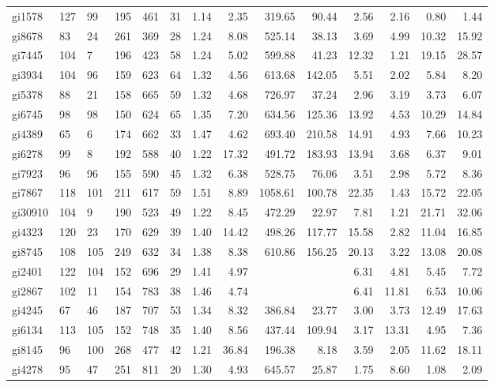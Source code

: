 \documentclass[runningheads]{llncs}
\begin{document}
{\begin{longtable}{l lllll rrrr rrrr }
gi1578 & 127 & 99 & 195 & 461 & 31 & 1.14 & 2.35 & 319.65 & 90.44 & 2.56 & 2.16 & 0.80 & 1.44 \\
gi8678 & 83 & 24 & 261 & 369 & 28 & 1.24 & 8.08 & 525.14 & 38.13 & 3.69 & 4.99 & 10.32 & 15.92 \\
gi7445 & 104 & 7 & 196 & 423 & 58 & 1.24 & 5.02 & 599.88 & 41.23 & 12.32 & 1.21 & 19.15 & 28.57 \\
gi3934 & 104 & 96 & 159 & 623 & 64 & 1.32 & 4.56 & 613.68 & 142.05 & 5.51 & 2.02 & 5.84 & 8.20 \\
gi5378 & 88 & 21 & 158 & 665 & 59 & 1.32 & 4.68 & 726.97 & 37.24 & 2.96 & 3.19 & 3.73 & 6.07 \\
gi6745 & 98 & 98 & 150 & 624 & 65 & 1.35 & 7.20 & 634.56 & 125.36 & 13.92 & 4.53 & 10.29 & 14.84 \\
gi4389 & 65 & 6 & 174 & 662 & 33 & 1.47 & 4.62 & 693.40 & 210.58 & 14.91 & 4.93 & 7.66 & 10.23 \\
gi6278 & 99 & 8 & 192 & 588 & 40 & 1.22 & 17.32 & 491.72 & 183.93 & 13.94 & 3.68 & 6.37 & 9.01 \\
gi7923 & 96 & 96 & 155 & 590 & 45 & 1.32 & 6.38 & 528.75 & 76.06 & 3.51 & 2.98 & 5.72 & 8.36 \\
gi7867 & 118 & 101 & 211 & 617 & 59 & 1.51 & 8.89 & 1058.61 & 100.78 & 22.35 & 1.43 & 15.72 & 22.05 \\
gi30910 & 104 & 9 & 190 & 523 & 49 & 1.22 & 8.45 & 472.29 & 22.97 & 7.81 & 1.21 & 21.71 & 32.06 \\
gi4323 & 120 & 23 & 170 & 629 & 39 & 1.40 & 14.42 & 498.26 & 117.77 & 15.58 & 2.82 & 11.04 & 16.85 \\
gi8745 & 108 & 105 & 249 & 632 & 34 & 1.38 & 8.38 & 610.86 & 156.25 & 20.13 & 3.22 & 13.08 & 20.08 \\
gi2401 & 122 & 104 & 152 & 696 & 29 & 1.41 & 4.97 &  &  & 6.31 & 4.81 & 5.45 & 7.72 \\
gi2867 & 102 & 11 & 154 & 783 & 38 & 1.46 & 4.74 &  &  & 6.41 & 11.81 & 6.53 & 10.06 \\
gi4245 & 67 & 46 & 187 & 707 & 53 & 1.34 & 8.32 & 386.84 & 23.77 & 3.00 & 3.73 & 12.49 & 17.63 \\
gi6134 & 113 & 105 & 152 & 748 & 35 & 1.40 & 8.56 & 437.44 & 109.94 & 3.17 & 13.31 & 4.95 & 7.36 \\
gi8145 & 96 & 100 & 268 & 477 & 42 & 1.21 & 36.84 & 196.38 & 8.18 & 3.59 & 2.05 & 11.62 & 18.11 \\
gi4278 & 95 & 47 & 251 & 811 & 20 & 1.30 & 4.93 & 645.57 & 25.87 & 1.75 & 8.60 & 1.08 & 2.09 \\

\end{longtable}}
\end{document}
